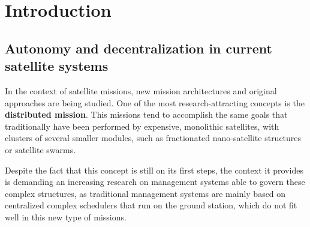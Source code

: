 
\chapter{Introduction} %

\label{Chapter1} %


\newcommand{\keyword}[1]{\textbf{#1}}
\newcommand{\tabhead}[1]{\textbf{#1}}
\newcommand{\code}[1]{\texttt{#1}}
\newcommand{\file}[1]{\texttt{\bfseries#1}}
\newcommand{\option}[1]{\texttt{\itshape#1}}

\section{Autonomy and decentralization in current satellite systems}

In the context of satellite missions, new mission architectures and original approaches are being studied. One of the most research-attracting concepts is the \textbf{distributed mission}. This missions tend to accomplish the same goals that traditionally have been performed by expensive, monolithic satellites, with clusters of several smaller modules, such as fractionated nano-satellite structures or satellite swarms.

Despite the fact that this concept is still on its first steps, the context it provides is demanding an increasing research on management systems able to govern these complex structures, as traditional management systems are mainly based on centralized complex schedulers that run on the ground station, which do not fit well in this new type of missions.

